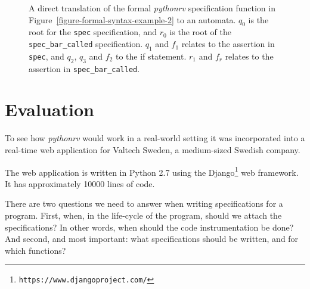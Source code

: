 \documentclass[a4paper,11pt]{kth-mag}
\theoremstyle{definition}
\begin{document}
\begin{figure}[h!]
\begin{minipage}{0.9\textwidth}
	\end{minipage}
  \caption{A direct translation of the formal \textit{pythonrv} specification
    function in Figure~\ref{figure-formal-syntax-example-2} to an automata.
    $q_0$ is the root for the \texttt{spec} specification, and $r_0$ is the
    root of the \texttt{spec\_bar\_called} specification. $q_1$ and $f_1$
    relates to the assertion in \texttt{spec}, and $q_2$, $q_3$ and $f_2$ to
    the if statement. $r_1$ and $f_r$ relates to the assertion in
    \texttt{spec\_bar\_called}.}
	\label{figure-formal-syntax-example-2-automata}
\end{figure}



\pagestyle{newchap}
\chapter{Evaluation} \label{chapter-evaluation}

To see how \textit{pythonrv} would work in a real-world setting it was
incorporated into a real-time web application for Valtech Sweden, a
medium-sized Swedish company.

The web application is written in Python 2.7 using the
Django\footnote{\texttt{https://www.djangoproject.com/}} web framework. It has
approximately 10000 lines of code.

There are two questions we need to answer when writing specifications for a
program. First, when, in the life-cycle of the program, should we attach the
specifications? In other words, when should the code instrumentation be done?
And second, and most important: what specifications should be written, and for
which functions?
\end{document}
